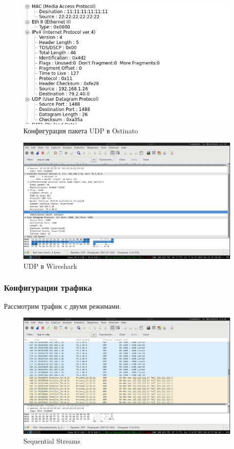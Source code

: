 \documentclass[12pt, a4paper] {ncc}
\begin{document}
	\begin{figure}[h!]
		\includegraphics[scale=0.5]{UDPStream_without_frag.png}
		\caption{Конфигурация пакета UDP в Ostinato}
		\center
	\end{figure}

	\begin{figure}[h!]
		\includegraphics[scale=0.4]{./CapturedUDP.png}
		\caption{UDP в Wireshark}
		\center
	\end{figure}

\subsubsection*{Конфигурации трафика}
	Рассмотрим трафик с двумя режимами.

	\begin{figure}[h!]
		\includegraphics[scale=0.4]{Seq.png}
		\caption{Sequential Streams}
		\center
	\end{figure}
\end{document}
